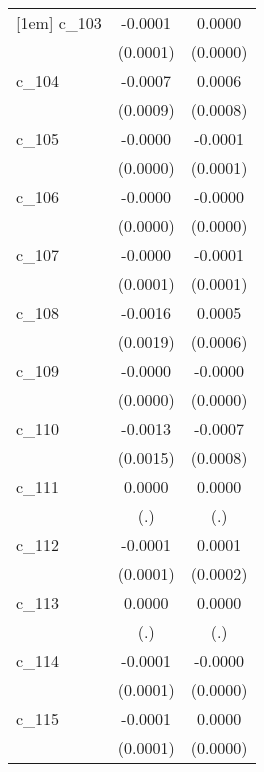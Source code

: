 {\begin{tabular}{l*{2}{c}}
[1em]
c\_103       &     -0.0001        &      0.0000        \\
            &    (0.0001)        &    (0.0000)        \\
[1em]
c\_104       &     -0.0007        &      0.0006        \\
            &    (0.0009)        &    (0.0008)        \\
[1em]
c\_105       &     -0.0000        &     -0.0001        \\
            &    (0.0000)        &    (0.0001)        \\
[1em]
c\_106       &     -0.0000        &     -0.0000        \\
            &    (0.0000)        &    (0.0000)        \\
[1em]
c\_107       &     -0.0000        &     -0.0001        \\
            &    (0.0001)        &    (0.0001)        \\
[1em]
c\_108       &     -0.0016        &      0.0005        \\
            &    (0.0019)        &    (0.0006)        \\
[1em]
c\_109       &     -0.0000        &     -0.0000        \\
            &    (0.0000)        &    (0.0000)        \\
[1em]
c\_110       &     -0.0013        &     -0.0007        \\
            &    (0.0015)        &    (0.0008)        \\
[1em]
c\_111       &      0.0000        &      0.0000        \\
            &         (.)        &         (.)        \\
[1em]
c\_112       &     -0.0001        &      0.0001        \\
            &    (0.0001)        &    (0.0002)        \\
[1em]
c\_113       &      0.0000        &      0.0000        \\
            &         (.)        &         (.)        \\
[1em]
c\_114       &     -0.0001        &     -0.0000        \\
            &    (0.0001)        &    (0.0000)        \\
[1em]
c\_115       &     -0.0001        &      0.0000        \\
            &    (0.0001)        &    (0.0000)        \\

\end{tabular}}
